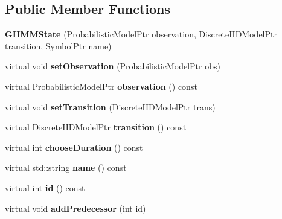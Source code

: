 \subsection*{Public Member Functions}
\begin{DoxyCompactItemize}
\item 
\mbox{\label{classtops_1_1GHMMState_a1cb3d607867c47639e56914585624603}} 
{\bfseries G\+H\+M\+M\+State} (Probabilistic\+Model\+Ptr observation, Discrete\+I\+I\+D\+Model\+Ptr transition, Symbol\+Ptr name)
\item 
\mbox{\label{classtops_1_1GHMMState_a5cffd17806bb68c56beb37e8553b5bcd}} 
virtual void {\bfseries set\+Observation} (Probabilistic\+Model\+Ptr obs)
\item 
\mbox{\label{classtops_1_1GHMMState_a173d2e0140e60128e1ef3b9186f1185d}} 
virtual Probabilistic\+Model\+Ptr {\bfseries observation} () const
\item 
\mbox{\label{classtops_1_1GHMMState_a49a48dd47af91147ff930fa55f656e38}} 
virtual void {\bfseries set\+Transition} (Discrete\+I\+I\+D\+Model\+Ptr trans)
\item 
\mbox{\label{classtops_1_1GHMMState_a9890351fbd3f312e9be769e324dd274f}} 
virtual Discrete\+I\+I\+D\+Model\+Ptr {\bfseries transition} () const
\item 
\mbox{\label{classtops_1_1GHMMState_a73b2789f91f5631ad64bf80d1a354460}} 
virtual int {\bfseries choose\+Duration} () const
\item 
\mbox{\label{classtops_1_1GHMMState_a6bd6141cf6f2eaeba1acbaaf84952263}} 
virtual std\+::string {\bfseries name} () const
\item 
\mbox{\label{classtops_1_1GHMMState_af64f0421ea08e1fe17b485d7de21726b}} 
virtual int {\bfseries id} () const
\item 
\mbox{\label{classtops_1_1GHMMState_aa0f1cdd4f9f4f54350f6a9fdb1ea6201}} 
virtual void {\bfseries add\+Predecessor} (int id)
\item 

\end{DoxyCompactItemize}
